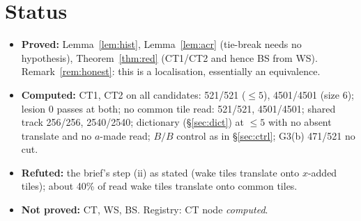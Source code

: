 \documentclass[11pt]{article}
\theoremstyle{definition}\newtheorem{definition}[theorem]{Definition}\newtheorem{remark}[theorem]{Remark}
\begin{document}
\section{Status}
\begin{itemize}
\item \textbf{Proved:} Lemma~\ref{lem:hist}, Lemma~\ref{lem:acr} (tie-break needs no hypothesis), Theorem~\ref{thm:red} (CT1/CT2 and hence BS from WS). Remark~\ref{rem:honest}: this is a localisation, essentially an equivalence.
\item \textbf{Computed:} CT1, CT2 on all candidates: 521/521 ($\le5$), 4501/4501 (size 6); lesion 0 passes at both; no common tile read: 521/521, 4501/4501; shared track 256/256, 2540/2540; dictionary (\S\ref{sec:dict}) at $\le5$ with no absent translate and no $a$-made read; $B/B$ control as in \S\ref{sec:ctrl}; G3(b) 471/521 no cut.
\item \textbf{Refuted:} the brief's step (ii) as stated (wake tiles translate onto $x$-added tiles); about 40\% of read wake tiles translate onto common tiles.
\item \textbf{Not proved:} CT, WS, BS. Registry: CT node \emph{computed}.
\end{itemize}
\end{document}
